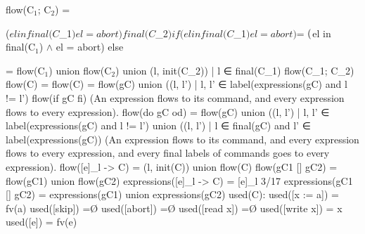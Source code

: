 flow(C$_1$; C$_2$)		 = \begin{cases}
($el in final(C$_1$) $\wedge$ el = abort) $\cup$ final(C$_2$) if (el in final(C$_1$) $\wedge$ el $\not$ = abort) $\not = \emptyset$ \\
($el in final(C$_1$) $\wedge$ el = abort) else
\end{cases}\newline

                        = flow(C$_1$) union flow(C$_2$) union { (l, init(C_2)) | l ∈ final(C_1) }
flow(C_1; C_2)
flow({C})               = flow(C)
                        = flow(gC) union { ((l, l') | l, l' ∈ label(expressions(gC) and l != l') }
flow(if gC fi)
         (An expression flows to its command,
         and every expression flows to every expression).
flow(do gC od)          = flow(gC) union
                          { ((l, l') | l, l' ∈ label(expressions(gC) and l != l') } union
                          { ((l, l') | l ∈ final(gC) and l' ∈ label(expressions(gC)) }
         (An expression flows to its command,
         and every expression flows to every expression,
         and every final labels of commands goes to every expression).
flow([e]_l -> C)        = {(l, init(C))} union flow(C)
flow(gC1 [] gC2)        = flow(gC1) union flow(gC2)
expressions([e]_l -> C)          = {[e]_l}
                                                                                                   3/17
expressions(gC1 [] gC2)      = expressions(gC1) union expressions(gC2)
used(C):
used([x := a])       = fv(a)
used([skip])         =Ø
used([abort])        =Ø
used([read x])       =Ø
used([write x])      = {x}
used([e])            = fv(e)

